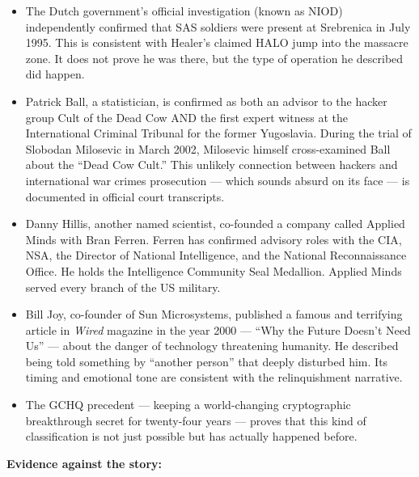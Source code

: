 \begin{itemize}
\item The Dutch government's official investigation (known as NIOD) independently confirmed that SAS soldiers were present at Srebrenica in July 1995. This is consistent with Healer's claimed HALO jump into the massacre zone. It does not prove he was there, but the type of operation he described did happen.
\item Patrick Ball, a statistician, is confirmed as both an advisor to the hacker group Cult of the Dead Cow AND the first expert witness at the International Criminal Tribunal for the former Yugoslavia. During the trial of Slobodan Milosevic in March 2002, Milosevic himself cross-examined Ball about the ``Dead Cow Cult.'' This unlikely connection between hackers and international war crimes prosecution --- which sounds absurd on its face --- is documented in official court transcripts.
\item Danny Hillis, another named scientist, co-founded a company called Applied Minds with Bran Ferren. Ferren has confirmed advisory roles with the CIA, NSA, the Director of National Intelligence, and the National Reconnaissance Office. He holds the Intelligence Community Seal Medallion. Applied Minds served every branch of the US military.
\item Bill Joy, co-founder of Sun Microsystems, published a famous and terrifying article in \textit{Wired} magazine in the year 2000 --- ``Why the Future Doesn't Need Us'' --- about the danger of technology threatening humanity. He described being told something by ``another person'' that deeply disturbed him. Its timing and emotional tone are consistent with the relinquishment narrative.
\item The GCHQ precedent --- keeping a world-changing cryptographic breakthrough secret for twenty-four years --- proves that this kind of classification is not just possible but has actually happened before.
\end{itemize}

\textbf{Evidence against the story:}

